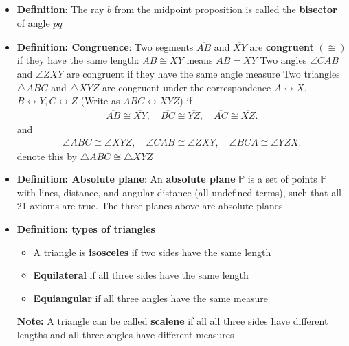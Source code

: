 \documentclass{report}
\begin{document}
\begin{itemize}
\begin{itemize}
            \end{itemize}
        \item \textbf{Definition}: The ray $b$ from the midpoint proposition is called the \textbf{bisector} of angle $\underline{pq}$ 
        \item \textbf{Definition: Congruence}: Two segments $\overline{AB}$ and $ \overline{XY}$ are \textbf{congruent} $(\cong)$ if they have the same length: $\overline{AB} \cong \overline{XY} $ means $AB = XY$
            \bigbreak \noindent 
            Two angles $\angle CAB$ and $\angle ZXY$ are congruent if they have the same angle measure
            \bigbreak \noindent 
            Two triangles $\triangle ABC$ and $\triangle XYZ$ are congruent under the correspondence $A\leftrightarrow X$, $B \leftrightarrow Y, C\leftrightarrow Z$ (Write as $ABC \leftrightarrow XYZ $) if 
            \begin{align*}
                \overline{AB} \cong \overline{XY},\quad \overline{BC} \cong\overline{YZ} ,\quad \overline{AC} \cong \overline{XZ}
            .\end{align*}
            and 
            \begin{align*}
                \angle ABC \cong \angle XYZ, \quad \angle CAB \cong \angle ZXY,\quad \angle BCA \cong \angle YZX
            .\end{align*}
            denote this by $\triangle ABC \cong \triangle XYZ $
        \item \textbf{Definition: Absolute plane}: An \textbf{absolute plane} $\mathbb{P}$ is a set of points $\mathbb{P}$ with lines, distance, and angular distance (all undefined terms), such that all 21 axioms are true. The three planes above are absolute planes
        \item \textbf{Definition: types of triangles}
            \begin{itemize}
                \item A triangle is \textbf{isosceles} if two sides have the same length
                \item \textbf{Equilateral} if all three sides have the same length
                \item \textbf{Equiangular} if all three angles have the same measure  
            \end{itemize}
            \textbf{Note:} A triangle can be called \textbf{scalene} if all all three sides have different lengths and all three angles have different measures



    \end{itemize}
\end{document}
